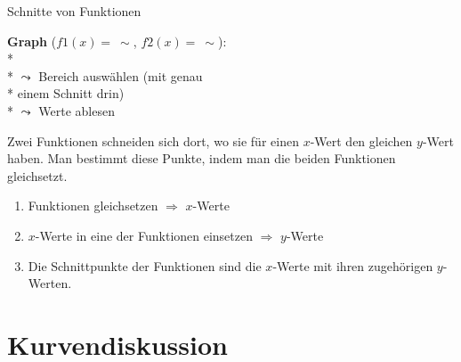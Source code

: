 \begin{bla}{Schnitte von Funktionen}
  \begin{marginfigure}
    \begin{tcolorbox}[colback=white!95!black,colframe=white!75!black,title=CAS:,arc=0mm]
      \begin{scriptsize}
        \textbf{Graph} (\( f1(x) = \ \sim \), \( f2(x) = \ \sim \)): \\*
         \\*
        \( \leadsto \) Bereich auswählen (mit genau \\* \text{\phantom{\( \leadsto \)}} einem Schnitt drin) \\*
        \( \leadsto \) Werte ablesen
      \end{scriptsize}
    \end{tcolorbox}
  \end{marginfigure}
  Zwei Funktionen schneiden sich dort, wo sie für einen $x$-Wert den gleichen $y$-Wert haben. Man bestimmt diese Punkte, indem man die beiden Funktionen gleichsetzt.
\end{bla}

\begin{koch}
  \begin{enumerate}
    \item Funktionen gleichsetzen $\Rightarrow$ $x$-Werte
    \item $x$-Werte in eine der Funktionen einsetzen $\Rightarrow$ $y$-Werte
    \item Die Schnittpunkte der Funktionen sind die $x$-Werte mit ihren zugehörigen $y$-Werten.
  \end{enumerate}
\end{koch}



\section{Kurvendiskussion}

